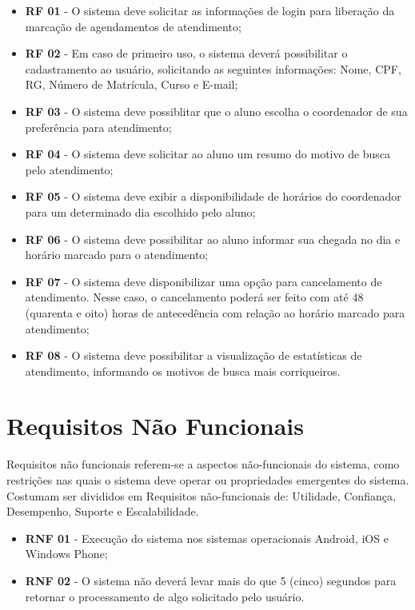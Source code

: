 		\begin{itemize}
			\item{\textbf{RF 01} - O sistema deve solicitar as informações de login para liberação da marcação de agendamentos de atendimento;}
			\item{\textbf{RF 02} - Em caso de primeiro uso, o sistema deverá possibilitar o cadastramento ao usuário, solicitando as seguintes informações: Nome, CPF, RG, Número de Matrícula, Curso e E-mail;}
			\item{\textbf{RF 03} - O sistema deve possiblitar que o aluno escolha o coordenador de sua preferência para atendimento;}
			\item{\textbf{RF 04} - O sistema deve solicitar ao aluno um resumo do motivo de busca pelo atendimento;}
			\item{\textbf{RF 05} - O sistema deve exibir a disponibilidade de horários do coordenador para um determinado dia escolhido pelo aluno;}
			\item{\textbf{RF 06} - O sistema deve possibilitar ao aluno informar sua chegada no dia e horário marcado para o atendimento;}
			\item{\textbf{RF 07} - O sistema deve disponibilizar uma opção para cancelamento de atendimento. Nesse caso, o cancelamento poderá ser feito com até 48 (quarenta e oito) horas de antecedência com relação ao horário marcado para atendimento;}
			\item{\textbf{RF 08} - O sistema deve possibilitar a visualização de estatísticas de atendimento, informando os motivos de busca mais corriqueiros.}
		\end{itemize}


	\section[Requisitos Não Funcionais]{Requisitos Não Funcionais}
	\label{sec:requisitos_nao_funcionais}

		Requisitos não funcionais referem-se a aspectos não-funcionais do sistema, como restrições nas quais o sistema deve operar ou propriedades emergentes do sistema. Costumam ser divididos em Requisitos não-funcionais de: Utilidade, Confiança, Desempenho, Suporte e Escalabilidade.

		\begin{itemize}
			\item{\textbf{RNF 01} - Execução do sistema nos sistemas operacionais Android, iOS e Windows Phone;}
			\item{\textbf{RNF 02} - O sistema não deverá levar mais do que 5 (cinco) segundos para retornar o processamento de algo solicitado pelo usuário.} 
		\end{itemize}


